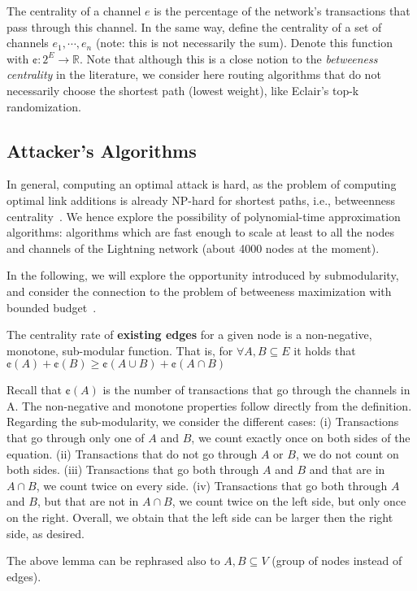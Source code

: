 The centrality of a channel $e$ is the percentage of the network's transactions 
that pass through this channel. In the same way, define the centrality of a set of channels $e_1, \cdots, e_n$ (note: this is not necessarily the sum). Denote this function with $\cent: 2^E \longrightarrow \mathbb{R}$. 
Note that although this is a close notion to the \emph{betweeness centrality}
in the literature, we consider here routing algorithms that do not necessarily choose the shortest path (lowest weight), like Eclair's top-k randomization. 

\subsection{Attacker's Algorithms}
    
In general, computing an optimal attack is hard,
as the problem of computing optimal link
additions is already NP-hard for shortest paths,
i.e., betweenness centrality~\cite{bergamini2018improving}.
We hence explore the possibility of polynomial-time
approximation algorithms: algorithms which are fast
enough to scale at least to 
all the nodes and channels of the Lightning network (about 4000 nodes at the moment).
   
  In the following, we will explore the opportunity introduced
  by submodularity, and consider the connection to 
  the problem of betweeness maximization with bounded budget~\cite{bei2011bounded}.
    
    \begin{lemma}\label{lemma:cent_submodular_existing}
        The centrality rate of \textbf{existing edges} for a given node is a 
        non-negative, monotone, sub-modular function. That is, 
        for $\forall A,B \subseteq E$ it holds that $\cent(A) + \cent(B) \ge \cent(A \cup B) + \cent(A \cap B)$
    \end{lemma}
    \begin{IEEEproof}
        Recall that $\cent(A)$ is the number of transactions that 
        go through the channels in A. The non-negative and monotone 
        properties follow directly from the definition. 
        Regarding the sub-modularity, we consider the
        different cases:  
        (i) Transactions that go through only 
        one of $A$ and $B$, we count exactly once 
        on both sides of the equation. (ii) Transactions that 
        do not go through $A$ or $B$, we do not count on both sides.
        (iii) Transactions that go both through $A$ and $B$ and that are in $A \cap B$,
        we count twice on every side. (iv) Transactions that go both through $A$ and $B$,
        but that are not in $A \cap B$, we count twice on the left side, but only once on
        the right.
        Overall, we obtain that the left side can be larger then the right side, 
        as desired.
    \end{IEEEproof}
    \begin{remark}
        The above lemma can be rephrased also to $A,B \subseteq V$ (group of nodes instead of edges).
    \end{remark}
    
